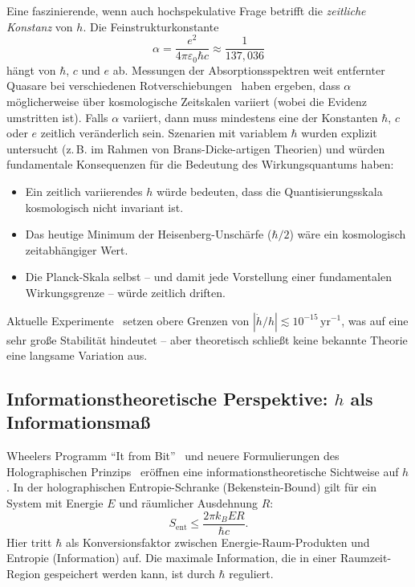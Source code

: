 ﻿\documentclass[12pt,a4paper]{article}
\theoremstyle{plain}
\theoremstyle{definition}
\theoremstyle{remark}
\begin{document}
Eine faszinierende, wenn auch hochspekulative Frage betrifft die \emph{zeitliche
Konstanz} von $h$. Die Feinstrukturkonstante
\begin{equation}
  \alpha = \frac{e^2}{4\pi\varepsilon_0 \hbar c} \approx \frac{1}{137{,}036}
\end{equation}
hängt von $\hbar$, $c$ und $e$ ab. Messungen der Absorptionsspektren weit entfernter
Quasare bei verschiedenen Rotverschiebungen~\cite{webb2001,king2012} haben ergeben, dass
$\alpha$ möglicherweise über kosmologische Zeitskalen variiert (wobei die Evidenz umstritten ist).
Falls $\alpha$ variiert, dann muss mindestens eine der Konstanten $\hbar$, $c$ oder $e$ zeitlich
veränderlich sein. Szenarien mit variablem $\hbar$ wurden explizit untersucht
(z.\,B. im Rahmen von Brans-Dicke-artigen Theorien) und würden fundamentale Konsequenzen
für die Bedeutung des Wirkungsquantums haben:

\begin{itemize}[leftmargin=2em]
  \item Ein zeitlich variierendes $h$ würde bedeuten, dass die Quantisierungsskala
        kosmologisch nicht invariant ist.
  \item Das heutige Minimum der Heisenberg-Unschärfe ($\hbar/2$) wäre ein
        kosmologisch zeitabhängiger Wert.
  \item Die Planck-Skala selbst -- und damit jede Vorstellung einer fundamentalen
        Wirkungsgrenze -- würde zeitlich driften.
\end{itemize}

Aktuelle Experimente~\cite{uzan2011} setzen obere Grenzen von
$|\dot{h}/h| \lesssim 10^{-15}\,\text{yr}^{-1}$, was auf eine sehr große
Stabilität hindeutet -- aber theoretisch schließt keine bekannte Theorie eine
langsame Variation aus.

\subsection{Informationstheoretische Perspektive: $h$ als Informationsmaß}

Wheelers Programm ``It from Bit''~\cite{wheeler1990} und neuere Formulierungen des
Holographischen Prinzips~\cite{bousso2002} eröffnen eine informationstheoretische
Sichtweise auf $h$. In der holographischen Entropie-Schranke (Bekenstein-Bound) gilt
für ein System mit Energie $E$ und räumlicher Ausdehnung $R$:
\begin{equation}
  S_{\mathrm{ent}} \leq \frac{2\pi k_B E R}{\hbar c}.
\end{equation}
Hier tritt $\hbar$ als Konversionsfaktor zwischen Energie-Raum-Produkten und
Entropie (Information) auf. Die maximale Information, die in einer Raumzeit-Region
gespeichert werden kann, ist durch $\hbar$ reguliert.
\end{document}
